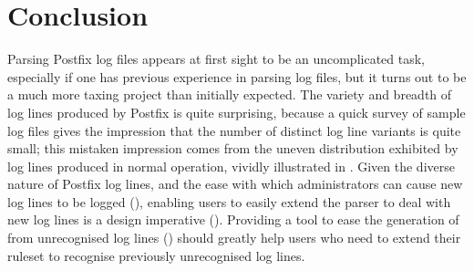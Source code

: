 \chapter{Conclusion}

\label{conclusion}

Parsing Postfix log files appears at first sight to be an uncomplicated
task, especially if one has previous experience in parsing log files, but
it turns out to be a much more taxing project than initially expected.  The
variety and breadth of log lines produced by Postfix is quite surprising,
because a quick survey of sample log files gives the impression that the
number of distinct log line variants is quite small; this mistaken
impression comes from the uneven distribution exhibited by log lines
produced in normal operation, vividly illustrated in .  Given the diverse nature of Postfix log lines, and the ease with
which administrators can cause new log lines to be logged
(), enabling users to easily extend the
parser to deal with new log lines is a design imperative
().  Providing a tool to ease the generation of
\regexes{} from unrecognised log lines () should greatly help users who need to extend their ruleset
to recognise previously unrecognised log lines.


